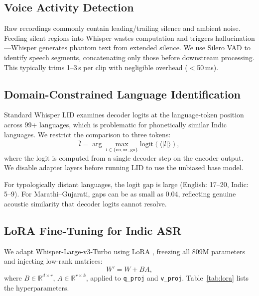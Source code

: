 \documentclass[11pt]{article}
\begin{document}
\subsection{Voice Activity Detection}\label{sec:vad}

Raw recordings commonly contain leading/trailing silence and ambient noise.  Feeding silent regions into Whisper wastes computation and triggers hallucination---Whisper generates phantom text from extended silence.  We use Silero VAD \citep{silero_vad} to identify speech segments, concatenating only those before downstream processing.  This typically trims 1--3\,s per clip with negligible overhead ($<$50\,ms).

\subsection{Domain-Constrained Language Identification}\label{sec:lid}

Standard Whisper LID examines decoder logits at the language-token position across 99+ languages, which is problematic for phonetically similar Indic languages.  We restrict the comparison to three tokens:
\begin{equation}
\hat{l} = \arg\max_{l \in \{\texttt{en}, \texttt{mr}, \texttt{gu}\}} \text{logit}(\langle|l|\rangle),
\label{eq:lid}
\end{equation}
where the logit is computed from a single decoder step on the encoder output.  We disable adapter layers before running LID to use the unbiased base model.

For typologically distant languages, the logit gap is large (English: 17--20, Indic: 5--9).  For Marathi--Gujarati, gaps can be as small as 0.04, reflecting genuine acoustic similarity that decoder logits cannot resolve.

\subsection{LoRA Fine-Tuning for Indic ASR}\label{sec:lora}

We adapt Whisper-Large-v3-Turbo \citep{openai_whisper_turbo} using LoRA \citep{hu2022lora}, freezing all 809M parameters and injecting low-rank matrices:
\begin{equation}
W' = W + BA,
\end{equation}
where $B \in \mathbb{R}^{d \times r}$, $A \in \mathbb{R}^{r \times k}$, applied to \texttt{q\_proj} and \texttt{v\_proj}.  Table~\ref{tab:lora} lists the hyperparameters.
\end{document}
